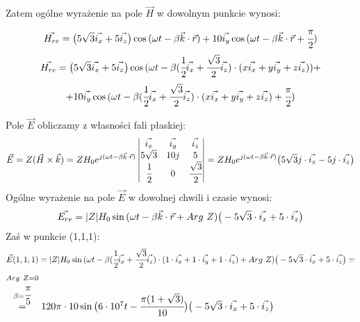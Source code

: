 \begin{solution}
Zatem ogólne wyrażenie na pole $\vec{H}$ w dowolnym punkcie wynosi:
$$ \vec{H_{re}} = \big{(} 5\sqrt{3}\vec{i_{x}}+5\vec{i_{z}}  \big{)}\cos{(\omega t - \beta \vec{k}\cdot\vec{r})} + 10\vec{i_{y}}\cos{(\omega t - \beta \vec{k}\cdot\vec{r}+\cfrac{\pi}{2}}) $$ $$ 
\vec{H_{re}} =\big{(}  5\sqrt{3}\vec{i_{x}}+5\vec{i_{z}} \big{)}\cos{(\omega t - \beta(\cfrac{1}{2}\vec{i_{x}}+\cfrac{\sqrt{3}}{2}\vec{i_{z}})\cdot (x\vec{i_{x}}+y\vec{i_{y}}+z\vec{i_{z}}) )} +$$ $$+ 10\vec{i_{y}}\cos{(\omega t - \beta(\cfrac{1}{2}\vec{i_{x}}+\cfrac{\sqrt{3}}{2}\vec{i_{z}})\cdot (x\vec{i_{x}}+y\vec{i_{y}}+z\vec{i_{z}})+\cfrac{\pi}{2} )}$$

Pole $\vec{E}$ obliczamy z własności fali płaskiej:
$$\vec{E}=Z(\vec{H}\times\vec{k})=Z H_{0} e^{j(\omega t - \beta\vec{k}\cdot\vec{r})}\begin{vmatrix}
					\vec{i_{x}}&\vec{i_{y}}&\vec{i_{z}}\\
				    5\sqrt{3}&10j&5\\
					\cfrac{1}{2}&0&\cfrac{\sqrt{3}}{2}\end{vmatrix}=Z H_{0} e^{j(\omega t           -        \beta\vec{k}\cdot\vec{r})}\big{(}5\sqrt{3}j\cdot\vec{i_{x}}-5j\cdot\vec{i_{z}}  \big{)}$$
Ogólne wyrażenie na pole $\vec{E}$ w dowolnej chwili i czasie wynosi:
$$\vec{E_{re}}= |Z| H_{0} \sin{(\omega t-\beta\vec{k}\cdot\vec{r}+Arg\ Z)}\big{(}-5\sqrt{3}\cdot\vec{i_{x}}+5\cdot\vec{i_{z}}  \big{)}$$
Zaś w punkcie (1,1,1):
$$ \vec{E}(1,1,1) = |Z| H_{0} \sin{(\omega t-\beta(\cfrac{1}{2}\vec{i_{x}}+\cfrac{\sqrt{3}}{2}\vec{i_{z}})\cdot (1\cdot\vec{i_{x}}+1\cdot\vec{i_{y}}+1\cdot\vec{i_{z}})+Arg\ Z)}\big{(}-5\sqrt{3}\cdot\vec{i_{x}}+5\cdot\vec{i_{z}}  \big{)}= $$
$\stackrel{\substack{Arg\ Z = 0 \\ \beta = \cfrac{\pi}{5}}}{=} 120\pi \cdot 10 \sin{\big{(}6\cdot 10^{7} t-\cfrac{\pi(1+\sqrt{3})}{10}\big{)}}\big{(}-5\sqrt{3}\cdot\vec{i_{x}}+5\cdot\vec{i_{z}}  \big{)}  $
\end{solution}
